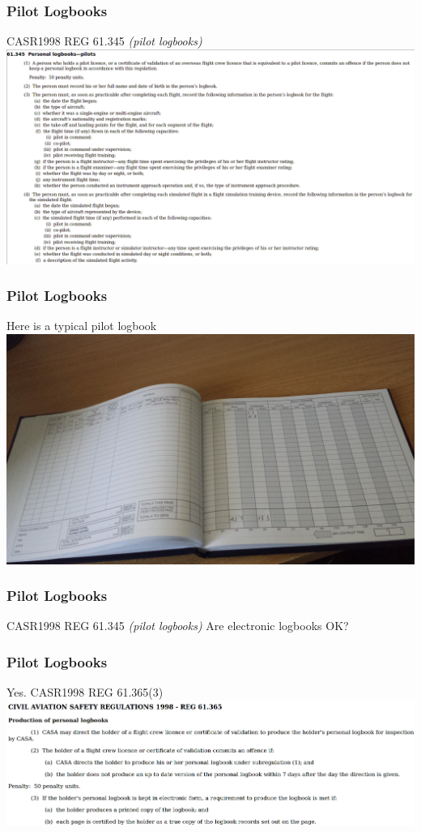 \begin{frame}
\frametitle{Pilot Logbooks}
\begin{block}{CASR1998 REG 61.345 \emph{(pilot logbooks)}}
\includegraphics[height=0.6\textheight]{image/casr-logbook.png}
\end{block}
\end{frame}

\begin{frame}
\frametitle{Pilot Logbooks}
\begin{block}{Here is a typical pilot logbook}
\includegraphics[height=0.5\textheight]{image/logbook.jpg}
\end{block}
\end{frame}

\begin{frame}
\frametitle{Pilot Logbooks}
\begin{block}{CASR1998 REG 61.345 \emph{(pilot logbooks)}}
Are electronic logbooks OK?
\end{block}
\end{frame}

\begin{frame}
\frametitle{Pilot Logbooks}
\begin{block}{Yes. CASR1998 REG 61.365(3)}
\includegraphics[height=0.3\textheight]{image/casr-logbook-production.png}
\end{block}
\end{frame}

